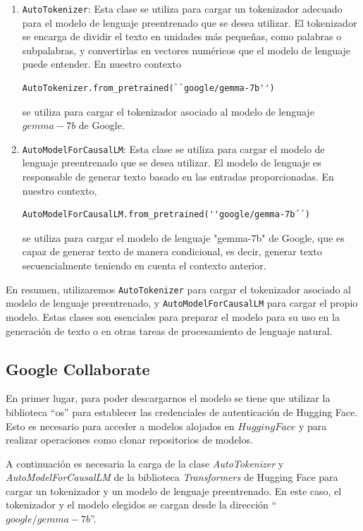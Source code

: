 \begin{enumerate}
	\item \texttt{AutoTokenizer}: Esta clase se utiliza para cargar un tokenizador adecuado para el modelo de lenguaje preentrenado que se desea utilizar. El tokenizador se encarga de dividir el texto en unidades más pequeñas, como palabras o subpalabras, y convertirlas en vectores numéricos que el modelo de lenguaje puede entender. En nuestro contexto 
	
\begin{verbatim}
AutoTokenizer.from_pretrained(``google/gemma-7b'')
\end{verbatim}

se utiliza para cargar el tokenizador asociado al modelo de lenguaje $gemma-7b$ de Google.
	
	\item \texttt{AutoModelForCausalLM}: Esta clase se utiliza para cargar el modelo de lenguaje preentrenado que se desea utilizar. El modelo de lenguaje es responsable de generar texto basado en las entradas proporcionadas. En nuestro contexto,
\begin{verbatim}
AutoModelForCausalLM.from_pretrained(''google/gemma-7b´´)
\end{verbatim}
	
se utiliza para cargar el modelo de lenguaje "gemma-7b" de Google, que es capaz de generar texto de manera condicional, es decir, generar texto secuencialmente teniendo en cuenta el contexto anterior.
\end{enumerate}

En resumen, utilizaremos \texttt{AutoTokenizer} para cargar el tokenizador asociado al modelo de lenguaje preentrenado, y \texttt{AutoModelForCausalLM} para cargar el propio modelo. Estas clases son esenciales para preparar el modelo para su uso en la generación de texto o en otras tareas de procesamiento de lenguaje natural.

\subsection{Google Collaborate}
En primer lugar, para poder descargarnos el modelo se tiene que utilizar la biblioteca ``os'' para establecer las credenciales de autenticación de Hugging Face. Esto es necesario para acceder a modelos alojados en $Hugging Face$ y para realizar operaciones como clonar repositorios de modelos.

A continuación es necesaria la carga de la clase \textit{AutoTokenizer} y \textit{AutoModelForCausalLM} de la biblioteca \textit{Transformers} de Hugging Face para cargar un tokenizador y un modelo de lenguaje preentrenado. En este caso, el tokenizador y el modelo elegidos se cargan desde la dirección ``$google/gemma-7b$''. 

